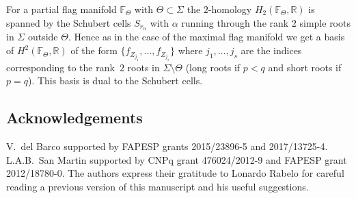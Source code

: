 \documentclass[10pt,a4paper]{amsart}
\numberwithin{equation}{section}
\begin{document}
For a partial flag manifold $\mathbb{F}_{\Theta }$ with $\Theta \subset \Sigma $ the $2$-homology $H_{2}(\mathbb{F}_{\Theta },\mathbb{R})$ is spanned by the Schubert cells $S_{r_{\alpha }}$ with $\alpha $ running
through the rank $2$ simple roots in $\Sigma $ outside $\Theta $. Hence as in the case of the maximal flag manifold we get a basis of $H^{2}(\mathbb{F}_{\Theta },\mathbb{R})$ of the form $\{f_{Z_{j_{1}}},\ldots,f_{Z_{j_{s}}}\}$ where $j_{1},\ldots,j_{s}$ are the indices corresponding to the rank~$2$ roots in $\Sigma \setminus \Theta $ (long roots if $p<q$ and short roots if $p=q$). This basis is dual to the Schubert cells.

\subsection*{Acknowledgements}

V.~del Barco supported by FAPESP grants 2015/23896-5 and 2017/13725-4. L.A.B.~San Martin supported by CNPq grant 476024/2012-9 and FAPESP grant 2012/18780-0. The authors express their gratitude to Lonardo Rabelo for careful reading a previous version of this manuscript and his useful suggestions.

\end{document}
